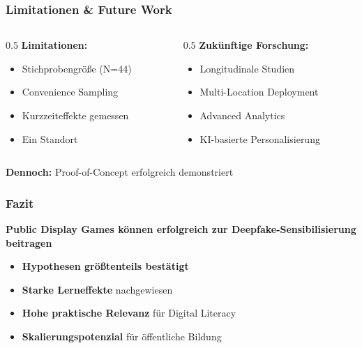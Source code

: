 \documentclass[aspectratio=169,t,xcolor=dvipsnames]{beamer}
\newcommand{\highlight}[1]{\textcolor{LMUBlue}{\textbf{#1}}}
\begin{document}
\begin{frame}
\begin{frame}
\frametitle{Limitationen \& Future Work}
\begin{columns}[T]
\begin{column}{0.5\textwidth}
\highlight{Limitationen:}
\begin{itemize}
\item Stichprobengröße (N=44)
\item Convenience Sampling
\item Kurzzeiteffekte gemessen
\item Ein Standort
\end{itemize}
\end{column}
\begin{column}{0.5\textwidth}
\highlight{Zukünftige Forschung:}
\begin{itemize}
\item Longitudinale Studien
\item Multi-Location Deployment
\item Advanced Analytics
\item KI-basierte Personalisierung
\end{itemize}
\end{column}
\end{columns}

\vspace{1em}
\begin{center}
\highlight{Dennoch:} Proof-of-Concept erfolgreich demonstriert
\end{center}
\end{frame}

\begin{frame}
\frametitle{Fazit}
\begin{center}
{\Large \highlight{Public Display Games können erfolgreich zur Deepfake-Sensibilisierung beitragen}}
\end{center}

\vspace{1em}
\begin{itemize}
\item \highlight{Hypothesen größtenteils bestätigt}
\item \highlight{Starke Lerneffekte} nachgewiesen
\item \highlight{Hohe praktische Relevanz} für Digital Literacy
\item \highlight{Skalierungspotenzial} für öffentliche Bildung
\end{itemize}


\end{frame}
\end{frame}
\end{document}
